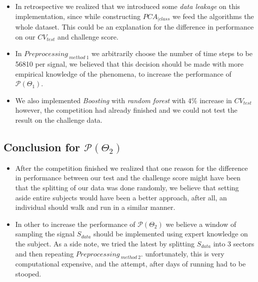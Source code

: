 \begin{itemize}
	\item In retrospective we realized that we introduced some \emph{data leakage} on this implementation, since while constructing $PCA_{|class}$ we feed the algorithms the whole dataset. This could be an explanation for the difference in performance on our $CV_{test}$ and challenge score.
	\item In $Preprocessing_{ \ method \ 1}$  we arbitrarily choose the number of time steps to be 56810 per signal, we believed that this decision should be made with more empirical knowledge of the phenomena, to increase the performance of $\mathcal{P}(\Theta_{1})$.
	\item We also implemented \emph{Boosting} with \emph{random forest} with $4\%$ increase in $CV_{test}$ however, the competition had already finished and we could not test the result on the challenge data.
\end{itemize}

\subsection{Conclusion for $\mathcal{P}(\Theta_{2})$}

\begin{itemize}
	\item After the competition finished we realized that one reason for the difference in performance between our test and the challenge score might have been that the splitting of our data was done randomly, we believe that setting aside entire subjects would have been a better approach, after all, an individual should walk and run in a similar manner.
	\item In other to increase the performance of $\mathcal{P}(\Theta_{2})$ we believe a window of sampling the signal $S_{data}$ should be implemented using expert knowledge on the subject. As a side note, we tried the latest by splitting $S_{data}$ into 3 sectors and then repeating $Preprocessing_{ \ method \ 2}$. unfortunately, this is very computational expensive, and the attempt, after days of running had to be stooped.

\end{itemize}




